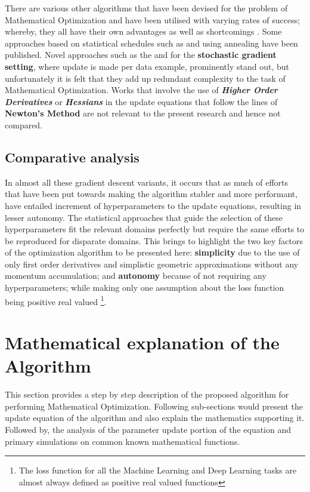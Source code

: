 \documentclass{article}
\begin{document}
There are various other algorithms that have been devised for the problem of Mathematical Optimization and have been utilised with varying rates of success; whereby, they all have their own advantages as well as shortcomings \cite{rudder:overview}. Some approaches based on statistical schedules such as \cite{darken:schedule} and using annealing \cite{robbins:annealing} have been published. Novel approaches such as the \cite{koolen:learning-learning-rate} and \cite{schaul:pesky} for the \textbf{stochastic gradient setting}, where update is made per data example, prominently stand out, but unfortunately it is felt that they add up redundant complexity to the task of Mathematical Optimization. Works that involve the use of \textit{\textbf{Higher Order Derivatives}} or \textit{\textbf{Hessians}} in the update equations that follow the lines of \textbf{Newton's Method} are not relevant to the present research and hence not compared.

\subsection{Comparative analysis}
In almost all these gradient descent variants, it occurs that as much of efforts that have been put towards making the algorithm stabler and more performant, have entailed increment of hyperparameters to the update equations, resulting in lesser autonomy. The statistical approaches that guide the selection of these hyperparameters fit the relevant domains perfectly but require the same efforts to be reproduced for disparate domains. This brings to highlight the two key factors of the optimization algorithm to be presented here: \textbf{simplicity} due to the use of only first order derivatives and simplistic geometric approximations without any momentum accumulation; and \textbf{autonomy} because of not requiring any hyperparameters; while making only one assumption about the loss function being positive real valued \footnote{The loss function for all the Machine Learning and Deep Learning tasks are almost always defined as positive real valued functions}.

\section{Mathematical explanation of the Algorithm}
This section provides a step by step description of the proposed algorithm for performing Mathematical Optimization.
Following sub-sections would present the update equation of the algorithm and also explain the mathematics supporting it. Followed by, the analysis of the parameter update portion of the equation and primary simulations on common known mathematical functions.
\end{document}

